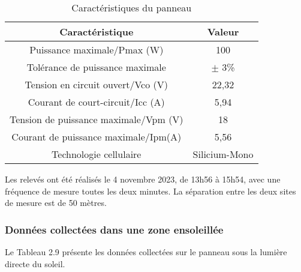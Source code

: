 \begin{table}[H]
	\centering
	\caption{Caractéristiques du panneau}
	\vspace{5mm}
	\begin{tabular}{|c|c|}
		\hline
		\textbf{Caractéristique} & \textbf{Valeur} \\
		\hline
		Puissance maximale/Pmax (W) & 100 \\
		\hline
		Tolérance de puissance maximale & $\pm$ 3\% \\
		\hline
		Tension en circuit ouvert/Vco (V) & 22,32 \\
		\hline
		Courant de court-circuit/Icc (A) & 5,94 \\
		\hline
		Tension de puissance maximale/Vpm (V) & 18 \\
		\hline
		Courant de puissance maximale/Ipm(A) & 5,56 \\
		\hline
		Technologie cellulaire & Silicium-Mono \\
		\hline
	\end{tabular}
\end{table}

Les relevés ont été réalisés le 4 novembre 2023, de 13h56 à 15h54, avec une fréquence de mesure toutes les deux minutes. La séparation entre les deux sites de mesure est de 50 mètres. 

\subsubsection{Données collectées dans une zone ensoleillée}
Le Tableau 2.9 présente les données collectées sur le panneau sous la lumière directe du soleil.

